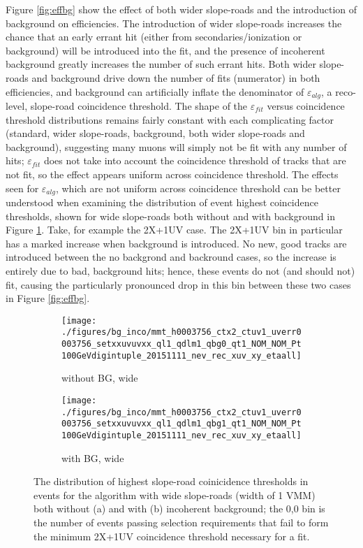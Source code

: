 Figure \ref{fig:effbg} show the effect of both wider slope-roads and the introduction of background on efficiencies.  The introduction of wider slope-roads increases the chance that an early errant hit (either from secondaries/ionization or background) will be introduced into the fit, and the presence of incoherent background greatly increases the number of such errant hits.  Both wider slope-roads and background drive down the number of fits (numerator) in both efficiencies, and background can artificially inflate the denominator of $\varepsilon_{alg}$, a reco-level, slope-road coincidence threshold.  The shape of the $\varepsilon_{fit}$ versus coincidence threshold distributions remains fairly constant with each complicating factor (standard, wider slope-roads, background, both wider slope-roads and background), suggesting many muons will simply not be fit with any number of hits; $\varepsilon_{fit}$ does not take into account the coincidence threshold of tracks that are not fit, so the effect appears uniform across coincidence threshold.  The effects seen for $\varepsilon_{alg}$, which are not uniform across coincidence threshold can be better understood when examining the distribution of event highest coincidence thresholds, shown for wide slope-roads both without and with background in Figure \ref{fig:ctrecobgwide}.  Take, for example the 2X+1UV case.  The 2X+1UV bin in particular has a marked increase when background is introduced.  No new, good tracks are introduced between the no backgrond and backround cases, so the increase is entirely due to bad, background hits; hence, these events do not (and should not) fit, causing the particularly pronounced drop in this bin between these two cases in Figure \ref{fig:effbg}.

\begin{figure}[!htbp]\captionsetup{justification=centering}\captionsetup{justification=centering}
  \centering
\begin{subfigure}[t]{0.450\textwidth\textwidth}\centering\texttt{[image: ./figures/bg\_inco/mmt\_h0003756\_ctx2\_ctuv1\_uverr0003756\_setxxuvuvxx\_ql1\_qdlm1\_qbg0\_qt1\_NOM\_NOM\_Pt100GeVdigintuple\_20151111\_nev\_rec\_xuv\_xy\_etaall]}\caption{without BG, wide}\end{subfigure}
\begin{subfigure}[t]{0.450\textwidth\textwidth}\centering\texttt{[image: ./figures/bg\_inco/mmt\_h0003756\_ctx2\_ctuv1\_uverr0003756\_setxxuvuvxx\_ql1\_qdlm1\_qbg1\_qt1\_NOM\_NOM\_Pt100GeVdigintuple\_20151111\_nev\_rec\_xuv\_xy\_etaall]}\caption{with BG, wide}\end{subfigure}
  \caption{\label{fig:ctrecobgwide} The distribution of highest slope-road coinicidence thresholds in events for the algorithm with wide slope-roads (width of 1 VMM) both without (a) and with (b) incoherent background; the 0,0 bin is the number of events passing selection requirements that fail to form the minimum 2X+1UV coincidence threshold necessary for a fit.}
\end{figure}


